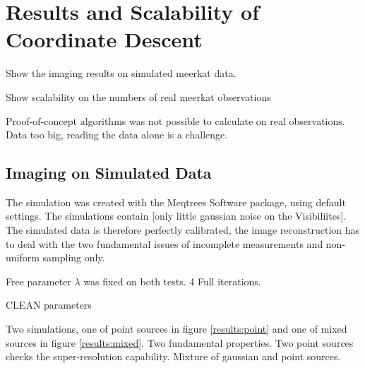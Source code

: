 \section{Results and Scalability of Coordinate Descent}
Show the imaging results on simulated meerkat data.

Show scalability on the numbers of real meerkat observations

Proof-of-concept algorithms was not possible to calculate on real observations. Data too big, reading the data alone is a challenge.



\subsection{Imaging on Simulated Data}
The simulation was created with the Meqtrees Software package, using default settings. The simulations contain [only little gaussian noise on the Visibiliites]. The simulated data is therefore perfectly calibrated, the image reconstruction has to deal with the two fundamental issues of incomplete measurements and non-uniform sampling only.

Free parameter $\lambda$ was fixed on both tests. 4 Full iterations.

CLEAN parameters

Two simulations, one of point sources in figure \ref{results:point} and one of mixed sources in figure \ref{results:mixed}. Two fundamental properties. Two point sources checks the super-resolution capability. Mixture of gaussian and point sources. 

